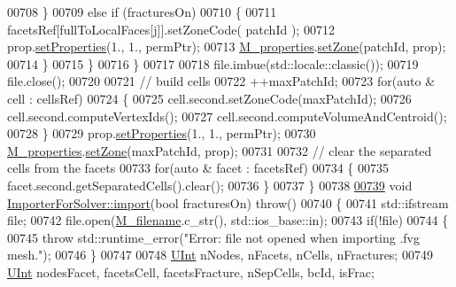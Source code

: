 \begin{DoxyCode}
00708             \}
00709             \textcolor{keywordflow}{else} \textcolor{keywordflow}{if} (fracturesOn)
00710             \{
00711                 facetsRef[fullToLocalFaces[j]].setZoneCode( patchId );
00712                 prop.\hyperlink{classFVCode3D_1_1Properties_a0ddb477254cfacdb96a440ddedc2548c}{setProperties}(1., 1., permPtr);
00713                 \hyperlink{classFVCode3D_1_1Importer_af678e18e971d5a132f5ba494981f6dae}{M\_properties}.\hyperlink{classFVCode3D_1_1PropertiesMap_ac303adadd1101e7bee62ecad0e8ea6ac}{setZone}(patchId, prop);
00714             \}
00715         \}
00716     \}
00717 
00718     file.imbue(std::locale::classic());
00719     file.close();
00720 
00721     \textcolor{comment}{// build cells}
00722     ++maxPatchId;
00723     \textcolor{keywordflow}{for}(\textcolor{keyword}{auto} & cell : cellsRef)
00724     \{
00725         cell.second.setZoneCode(maxPatchId);
00726         cell.second.computeVertexIds();
00727         cell.second.computeVolumeAndCentroid();
00728     \}
00729     prop.\hyperlink{classFVCode3D_1_1Properties_a0ddb477254cfacdb96a440ddedc2548c}{setProperties}(1., 1., permPtr);
00730     \hyperlink{classFVCode3D_1_1Importer_af678e18e971d5a132f5ba494981f6dae}{M\_properties}.\hyperlink{classFVCode3D_1_1PropertiesMap_ac303adadd1101e7bee62ecad0e8ea6ac}{setZone}(maxPatchId, prop);
00731 
00732     \textcolor{comment}{// clear the separated cells from the facets}
00733     \textcolor{keywordflow}{for}(\textcolor{keyword}{auto} & facet : facetsRef)
00734     \{
00735         facet.second.getSeparatedCells().clear();
00736     \}
00737 \}
00738 
\hypertarget{Import_8cpp_source.tex_l00739}{}\hyperlink{classFVCode3D_1_1ImporterForSolver_a4ad5aee92b6abe9b6ed5150c707a83ad}{00739} \textcolor{keywordtype}{void} \hyperlink{classFVCode3D_1_1ImporterForSolver_a4ad5aee92b6abe9b6ed5150c707a83ad}{ImporterForSolver::import}(\textcolor{keywordtype}{bool} fracturesOn) \textcolor{keywordflow}{throw}()
00740 \{
00741     std::ifstream file;
00742     file.open(\hyperlink{classFVCode3D_1_1Importer_a318e689fb93c5c906f85aa13685724d7}{M\_filename}.c\_str(), std::ios\_base::in);
00743     \textcolor{keywordflow}{if}(!file)
00744     \{
00745         \textcolor{keywordflow}{throw} std::runtime\_error(\textcolor{stringliteral}{"Error: file not opened when importing .fvg mesh."});
00746     \}
00747 
00748     \hyperlink{namespaceFVCode3D_a4bf7e328c75d0fd504050d040ebe9eda}{UInt} nNodes, nFacets, nCells, nFractures;
00749     \hyperlink{namespaceFVCode3D_a4bf7e328c75d0fd504050d040ebe9eda}{UInt} nodesFacet, facetsCell, facetsFracture, nSepCells, bcId, isFrac;

\end{DoxyCode}
